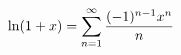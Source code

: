 \documentclass[preview]{standalone}
\begin{document}
\begin{align*}
\special{dvisvgm:raw <g id='unique000'>}\ln(1+x)=\displaystyle\sum_{n=1}^{\infty}\dfrac{(-1)^{n-1}x^n}{n}\special{dvisvgm:raw </g>}
\end{align*}
\end{document}
